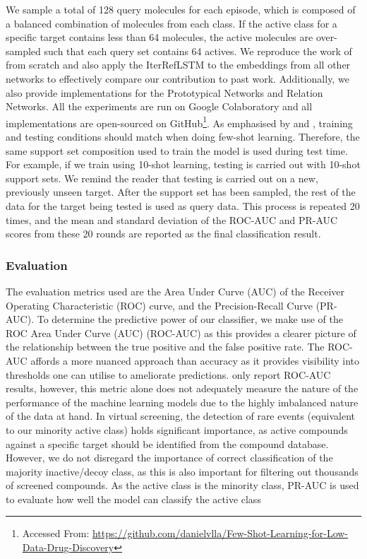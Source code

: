 We sample a total of 128 query molecules for each episode, which is composed of a balanced combination of molecules from each class. If the active class for a specific target contains less than 64 molecules, the active molecules are over-sampled such that each query set contains 64 actives. We reproduce the work of \citet{altae2017low} from scratch and also apply the IterRefLSTM to the embeddings from all other networks to effectively compare our contribution to past work. Additionally, we also provide implementations for the Prototypical Networks and Relation Networks. All the experiments are run on Google Colaboratory and all implementations are open-sourced on GitHub\footnote{Accessed From: \url{https://github.com/danielvlla/Few-Shot-Learning-for-Low-Data-Drug-Discovery}}. As  emphasised by \citet{vinyals2016matching} and \citet{snell2017prototypical}, training and testing conditions should match when doing few-shot learning. Therefore, the same support set composition used to train the model is used during test time. For example, if we train using 10-shot learning, testing is carried out with 10-shot support sets. We remind the reader that testing is carried out on a new, previously unseen target. After the support set has been sampled, the rest of the data for the target being tested is used as query data. This process is repeated 20 times, and the mean and standard deviation of the ROC-AUC and PR-AUC scores from these 20 rounds are reported as the final classification result.

\subsubsection{Evaluation}

The evaluation metrics used are the Area Under Curve (AUC) of the Receiver Operating Characteristic (ROC) curve, and the Precision-Recall Curve (PR-AUC). To determine the predictive power of our classifier, we make use of the ROC Area Under Curve (AUC) (ROC-AUC) as this provides a clearer picture of the relationship between the true positive and the false positive rate. The ROC-AUC affords a more nuanced approach than accuracy as it provides visibility into thresholds one can utilise to ameliorate predictions. \citet{altae2017low} only report ROC-AUC results, however, this metric alone does not adequately measure the nature of the performance of the machine learning models due to the highly imbalanced nature of the data at hand. In virtual screening, the detection of rare events (equivalent to our minority active class) holds significant importance, as active compounds against a specific target should be identified from the compound database. However, we do not disregard the importance of correct classification of the majority inactive/decoy class, as this is also important for filtering out thousands of screened compounds. As the active class is the minority class, PR-AUC is used to evaluate how well the model can classify the active class

